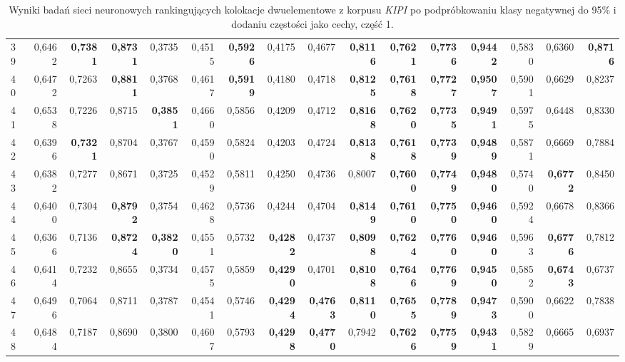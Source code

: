\begin{table}[htp!]
\begin{adjustwidth}{-2cm}{}
\begin{tabular}{ l | *{15}{| r}}
39	&	0,6462	&	\textbf{0,7381}	&	\textbf{0,8731}	&	0,3735	&	0,4515	&	\textbf{0,5926}	&	0,4175	&	0,4677	&	\textbf{0,8116}	&	\textbf{0,7621}	&	\textbf{0,7736}	&	\textbf{0,9442}	&	0,5830	&	0,6360	&	\textbf{0,8716}	\\
40	&	0,6472	&	0,7263	&	\textbf{0,8811}	&	0,3768	&	0,4617	&	\textbf{0,5919}	&	0,4180	&	0,4718	&	\textbf{0,8125}	&	\textbf{0,7618}	&	\textbf{0,7727}	&	\textbf{0,9507}	&	0,5901	&	0,6629	&	0,8237	\\
41	&	0,6538	&	0,7226	&	0,8715	&	\textbf{0,3851}	&	0,4660	&	0,5856	&	0,4209	&	0,4712	&	\textbf{0,8168}	&	\textbf{0,7620}	&	\textbf{0,7735}	&	\textbf{0,9491}	&	0,5975	&	0,6448	&	0,8330	\\
42	&	0,6396	&	\textbf{0,7321}	&	0,8704	&	0,3767	&	0,4590	&	0,5824	&	0,4203	&	0,4724	&	\textbf{0,8138}	&	\textbf{0,7618}	&	\textbf{0,7739}	&	\textbf{0,9489}	&	0,5871	&	0,6669	&	0,7884	\\
43	&	0,6382	&	0,7277	&	0,8671	&	0,3725	&	0,4529	&	0,5811	&	0,4250	&	0,4736	&	0,8007	&	\textbf{0,7600}	&	\textbf{0,7749}	&	\textbf{0,9480}	&	0,5740	&	\textbf{0,6772}	&	0,8450	\\
44	&	0,6400	&	0,7304	&	\textbf{0,8792}	&	0,3754	&	0,4628	&	0,5736	&	0,4244	&	0,4704	&	\textbf{0,8149}	&	\textbf{0,7610}	&	\textbf{0,7750}	&	\textbf{0,9460}	&	0,5924	&	0,6678	&	0,8366	\\
45	&	0,6366	&	0,7136	&	\textbf{0,8724}	&	\textbf{0,3820}	&	0,4551	&	0,5732	&	\textbf{0,4282}	&	0,4737	&	\textbf{0,8098}	&	\textbf{0,7624}	&	\textbf{0,7760}	&	\textbf{0,9460}	&	0,5963	&	\textbf{0,6776}	&	0,7812	\\
46	&	0,6414	&	0,7232	&	0,8655	&	0,3734	&	0,4575	&	0,5859	&	\textbf{0,4290}	&	0,4701	&	\textbf{0,8108}	&	\textbf{0,7646}	&	\textbf{0,7769}	&	\textbf{0,9450}	&	0,5852	&	\textbf{0,6743}	&	0,6737	\\
47	&	0,6496	&	0,7064	&	0,8711	&	0,3787	&	0,4541	&	0,5746	&	\textbf{0,4294}	&	\textbf{0,4763}	&	\textbf{0,8110}	&	\textbf{0,7655}	&	\textbf{0,7789}	&	\textbf{0,9473}	&	0,5900	&	0,6622	&	0,7838	\\
48	&	0,6484	&	0,7187	&	0,8690	&	0,3800	&	0,4607	&	0,5793	&	\textbf{0,4298}	&	\textbf{0,4770}	&	0,7942	&	\textbf{0,7626}	&	\textbf{0,7759}	&	\textbf{0,9431}	&	0,5829	&	0,6665	&	0,6937	\\
	\bottomrule
\end{tabular}
 \end{adjustwidth}
\caption[Wyniki badań sieci neuronowych rankingujących kolokacje dwuelementowe z korpusu \emph{KIPI} po podpróbkowaniu klasy negatywnej do 95\% i dodaniu częstości jako cechy, część 1]{Wyniki badań sieci neuronowych rankingujących kolokacje dwuelementowe z korpusu \emph{KIPI} po podpróbkowaniu klasy negatywnej do 95\% i dodaniu częstości jako cechy, część 1.}
\label{KIPI_sub5_nn_add_freq_part_1}
\end{table}

